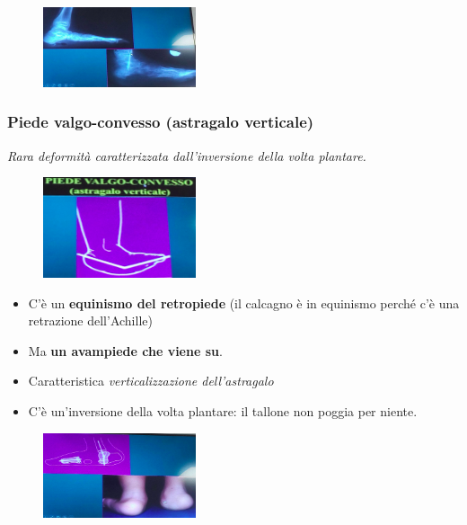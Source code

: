 \begin{figure}[!ht]
\centering
\includegraphics[width=0.4\textwidth]{016/image42.png}
\end{figure}

\subsubsection{Piede valgo-convesso (astragalo verticale)}

\emph{Rara deformità caratterizzata dall'inversione della volta plantare.}

\begin{figure}[!ht]
\centering
\includegraphics[width=0.4\textwidth]{016/image43.png}
\end{figure}

\begin{itemize}
\item
  C'è un \textbf{equinismo del retropiede} (il calcagno è in equinismo perché c'è una retrazione dell'Achille)
\item
  Ma \textbf{un avampiede che viene su}.
\item
  Caratteristica \emph{verticalizzazione dell'astragalo}
\item
  C'è un'inversione della volta plantare: il tallone non poggia per niente.
\end{itemize}

\begin{figure}[!ht]
\centering
\includegraphics[width=0.4\textwidth]{016/image44.png}
\end{figure}

